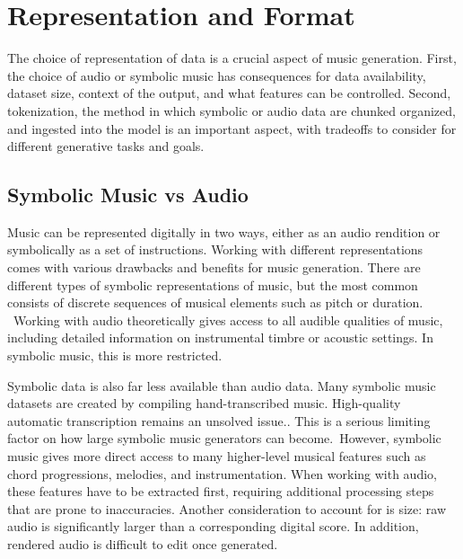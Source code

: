\section{Representation and Format}\label{section:representation}
The choice of representation of data is a crucial aspect of music generation. First, the choice of audio or symbolic music has consequences for data availability, dataset size, context of the output, and what features can be controlled. Second, tokenization, the method in which symbolic or audio data are chunked organized, and ingested into the model is an important aspect, with tradeoffs to consider for different generative tasks and goals. 


\subsection{Symbolic Music vs Audio}\label{section:symbolic_audio}
Music can be represented digitally in two ways, either as an audio rendition or symbolically as a set of instructions. Working with different representations comes with various drawbacks and benefits for music generation. There are different types of symbolic representations of music, but the most common consists of discrete sequences of musical elements such as pitch or duration.  Working with audio theoretically gives access to all audible qualities of music, including detailed information on instrumental timbre or acoustic settings. In symbolic music, this is more restricted. 

Symbolic data is also far less available than audio data. Many symbolic music datasets are created by compiling hand-transcribed music. High-quality automatic transcription remains an unsolved issue.\cite{Ji_Yang_Luo_survey_symbolic_2024}\cite{Chen_Smith_Spijkervet_Wang_Zou_Li_Kong_Du_2024}. This is a serious limiting factor on how large symbolic music generators can become. However, symbolic music gives more direct access to many higher-level musical features such as chord progressions, melodies, and instrumentation. When working with audio, these features have to be extracted first, requiring additional processing steps that are prone to inaccuracies. 
Another consideration to account for is size: raw audio is significantly larger than a corresponding digital score. In addition, rendered audio is difficult to edit once generated. 
 
